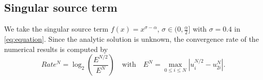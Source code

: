 \documentclass{amsart}
\theoremstyle{definition}
\theoremstyle{remark}
\numberwithin{equation}{section}
\begin{document}


\subsection{Singular source term}

We take the singular source term \(f(x)=x^{\sigma-\alpha}\), \(\sigma\in(0, \frac{\alpha}{2}]\) with $\sigma=0.4$ in \eqref{eq:equation}.
Since the analytic solution is unknown, the convergence rate of the numerical results is computed by
\begin{equation*}
  Rate^N = \log_2 \left( \frac{E^{N/2}}{E^{N}} \right)
  \quad \text{with} \quad
  E^N = \max_{0\le i\le N} |u^{N/2}_i - u^{N}_{2i}|.
\end{equation*}

\end{document}
